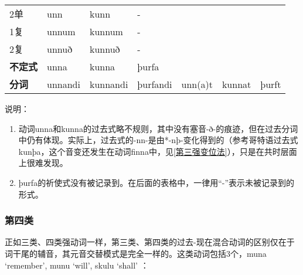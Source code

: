 \begin{longtable}{lllllll}
    2单             & unn                      & kunn                     & -        & ~       & ~      & ~       \\
    1复             & unnum                    & kunnum                   & -        & ~       & ~      & ~       \\
    2复             & unnuð                    & kunnuð                   & -        & ~       & ~      & ~       \\
    \textbf{不定式} & unna                     & kunna                    & þurfa    & ~       & ~      & ~       \\
    \textbf{分词}   & unnandi                  & kunnandi                 & þurfandi & unn(a)t & kunnat &
    þurft                                                                                                         \\
\end{longtable}


说明：


\begin{enumerate}

    \item
          动词unna和kunna的过去式略不规则，其中没有塞音-ð-的痕迹，但在过去分词中仍有体现。实际上，过去式的-nn-是由*-nþ-变化得到的（参考哥特语过去式kunþa，这个音变还发生在动词finna中，见\ref{第三强变位法}），只是在共时层面上很难发现。
    \item
          þurfa的祈使式没有被记录到。在后面的表格中，一律用``-''表示未被记录到的形式。
\end{enumerate}

\subsubsection{第四类}

正如三类、四类强动词一样，第三类、第四类的过去-现在混合动词的区别仅在于词干尾的辅音，其元音交替模式是完全一样的。这类动词包括3个，muna
`remember‌', munu `will‌', skulu `shall‌' ：

